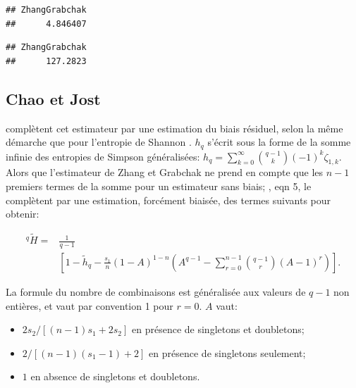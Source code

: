 \documentclass[
  11pt,
  french,
  a4paper,
  extrafontsizes,onecolumn,openright
  ]{memoir}
\newenvironment{Shaded}{\begin{snugshade}}{\end{snugshade}}
\newcommand{\DataTypeTok}[1]{\textcolor[rgb]{0.13,0.29,0.53}{#1}}
\newcommand{\DecValTok}[1]{\textcolor[rgb]{0.00,0.00,0.81}{#1}}
\newcommand{\KeywordTok}[1]{\textcolor[rgb]{0.13,0.29,0.53}{\textbf{#1}}}
\newcommand{\NormalTok}[1]{#1}
\newcommand{\OperatorTok}[1]{\textcolor[rgb]{0.81,0.36,0.00}{\textbf{#1}}}
\newcommand{\StringTok}[1]{\textcolor[rgb]{0.31,0.60,0.02}{#1}}
\providecommand{\tightlist}{%
  \setlength{\itemsep}{0pt}\setlength{\parskip}{0pt}}
\begin{document}
\begin{verbatim}
## ZhangGrabchak 
##      4.846407
\end{verbatim}

\begin{Shaded}
\end{Shaded}

\begin{verbatim}
## ZhangGrabchak 
##      127.2823
\end{verbatim}

\normalsize

\hypertarget{sec-BiaisHCDT}{%
\subsection{Chao et Jost}\label{sec-BiaisHCDT}}

\textcite{Chao2015} complètent cet estimateur par une estimation du biais résiduel, selon la même démarche que pour l'entropie de Shannon \autocite{Chao2013}.
\(h_q\) s'écrit sous la forme de la somme infinie des entropies de Simpson généralisées: \(h_q = \sum_{k=0}^{\infty}{\binom{q-1}{k}(-1)^k\zeta_{1,k}}\).
Alors que l'estimateur de Zhang et Grabchak ne prend en compte que les \(n-1\) premiers termes de la somme pour un estimateur sans biais; \textcite{Chao2015}, eqn 5, le complètent par une estimation, forcément biaisée, des termes suivants pour obtenir:

\begin{align}
  \label{eq:HqChaoJost}
  ^q\!{\tilde{H}} = 
  &\frac{1}{q-1} \\
  &\left[ 1 -\tilde{h}_q -\frac{s_{1}}{n} {\left( 1-A \right)}^{1-n} \left( A^{q-1} -\sum^{n-1}_{r=0}{ \binom{q-1}{r} {\left(A-1\right)}^r} \right) \right].
\end{align}

La formule du nombre de combinaisons est généralisée aux valeurs de \(q-1\) non entières, et vaut par convention 1 pour \(r=0\). \(A\) vaut:

\begin{itemize}
\tightlist
\item
  \(2s_{2}/{\left[\left(n-1\right) s_{1} +2s_{2}\right]}\) en présence de singletons et doubletons;
\item
  \(2/{\left[\left(n-1\right)\left(s_{1} -1\right)+2\right]}\) en présence de singletons seulement;
\item
  \(1\) en absence de singletons et doubletons.
\end{itemize}
\end{document}
